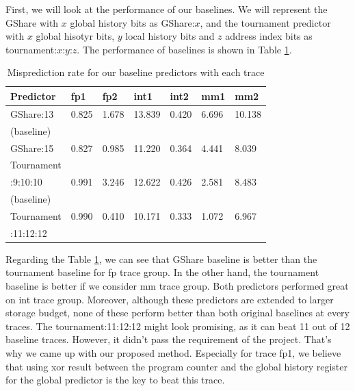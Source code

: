 \documentclass[conference]{IEEEtran}
\begin{document}
First, we will look at the performance of our baselines. We will represent the
GShare with $x$ global history bits as GShare:$x$, and the tournament predictor
with $x$ global hisotyr bits, $y$ local history bits and $z$ address index bits
as tournament:$x$:$y$:$z$. The performance of baselines is shown in Table \ref{table:baseline_performance}.

\begin{scriptsize}
\begin{table}[h!]
  \centering
  \caption{Misprediction rate for our baseline predictors with each trace}
  \label{table:baseline_performance}
  \begin{tabular}{|l|l|l|l|l|l|l|}
    \hline
    \textbf{Predictor} & \textbf{fp1} & \textbf{fp2} & \textbf{int1} &\textbf{int2} & \textbf{mm1} & \textbf{mm2}\\
    \hline
    \hline
    GShare:13 & 0.825 & 1.678 & 13.839 & 0.420 & 6.696 & 10.138 \\
    (baseline) & & & & & & \\
    \hline
    GShare:15 & 0.827 & 0.985 & 11.220 & 0.364 & 4.441 & 8.039 \\
    \hline
    Tournament & & & & & & \\
    :9:10:10 & 0.991 & 3.246 & 12.622 & 0.426 & 2.581 & 8.483 \\
    (baseline) & & & & & & \\
    \hline
    Tournament & 0.990 & 0.410 & 10.171 & 0.333 & 1.072 & 6.967 \\
    :11:12:12 & & & & & & \\
    \hline
  \end{tabular}
\end{table}
\end{scriptsize}

Regarding the Table \ref{table:baseline_performance}, we can see that GShare baseline is better than
the tournament baseline for fp trace group. In the other hand, the tournament
baseline is better if we consider mm trace group. Both predictors performed
great on int trace group. Moreover, although these predictors are extended
to larger storage budget, none of these perform better than both original baselines
at every traces. The tournament:11:12:12 might look promising, as it can beat 11 out of 12
baseline traces. However, it didn't pass the requirement of the project. That's why we came up
with our proposed method. Especially for trace fp1, we believe that using xor result
between the program counter and the global history register for the global predictor
is the key to beat this trace.
\end{document}
